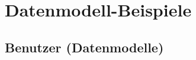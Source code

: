 \section{Datenmodell-Beispiele}
\subsection{Benutzer (Datenmodelle)}
\label{Datenmodelle}










